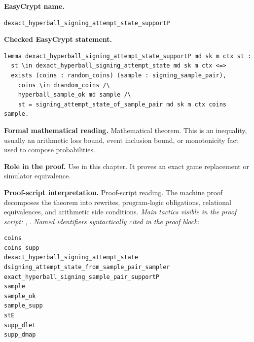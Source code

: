 \begin{formaltheorem}
\noindent\textbf{EasyCrypt name.}
\begin{lstlisting}[language=EasyCrypt,basicstyle=\ttfamily\scriptsize]
dexact_hyperball_signing_attempt_state_supportP
\end{lstlisting}
\noindent\textbf{Checked EasyCrypt statement.}
\begin{lstlisting}[language=EasyCrypt,basicstyle=\ttfamily\scriptsize]
lemma dexact_hyperball_signing_attempt_state_supportP md sk m ctx st :
  st \in dexact_hyperball_signing_attempt_state md sk m ctx <=>
  exists (coins : random_coins) (sample : signing_sample_pair),
    coins \in drandom_coins /\
    hyperball_sample_ok md sample /\
    st = signing_attempt_state_of_sample_pair md sk m ctx coins sample.
\end{lstlisting}
\noindent\textbf{Formal mathematical reading.}
Mathematical theorem. This is an inequality, usually an arithmetic loss bound, event inclusion bound, or monotonicity fact used to compose probabilities.

\noindent\textbf{Role in the proof.}
Use in this chapter. It proves an exact game replacement or simulator equivalence.

\noindent\textbf{Proof-script interpretation.}
Proof-script reading. The machine proof decomposes the theorem into rewrites, program-logic obligations, relational equivalences, and arithmetic side conditions.
\emph{Main tactics visible in the proof script:} , .
\emph{Named identifiers syntactically cited in the proof block:}
\begin{lstlisting}[language=EasyCrypt,basicstyle=\ttfamily\scriptsize]
coins
coins_supp
dexact_hyperball_signing_attempt_state
dsigning_attempt_state_from_sample_pair_sampler
exact_hyperball_signing_sample_pair_supportP
sample
sample_ok
sample_supp
stE
supp_dlet
supp_dmap
\end{lstlisting}

\end{formaltheorem}

